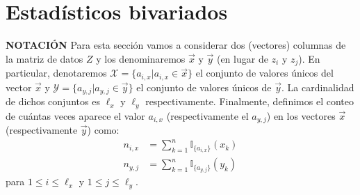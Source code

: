 \documentclass[
]{book}
\begin{document}
\hypertarget{estaduxedsticos-bivariados}{%
\section{Estadísticos bivariados}\label{estaduxedsticos-bivariados}}

\textbf{NOTACIÓN} Para esta sección vamos a considerar dos (vectores) columnas de la matriz de datos \(Z\) y los denominaremos \(\vec{x}\) y \(\vec{y}\) (en lugar de \(z_i\) y \(z_j\)). En particular, denotaremos \(\mathcal{X} = \{ a_{i, x } | a_{i,x} \in \vec{x} \}\) el conjunto de valores únicos del vector \(\vec{x}\) y \(\mathcal{Y} = \{ a_{y ,j} | a_{y ,j} \in \vec{y} \}\) el conjunto de valores únicos de \(\vec{y}\). La cardinalidad de dichos conjuntos es \(\ell_{x}\) y \(\ell_{y}\) respectivamente. Finalmente, definimos el conteo de cuántas veces aparece el valor \(a_{i,x }\) (respectivamente el \(a_{y ,j}\)) en los vectores \(\vec{x}\) (respectivamente \(\vec{y}\)) como:
\begin{equation}
\begin{aligned}
n_{i,x } & = \sum\limits_{k=1}^{n} \mathbb{I}_{\{ a_{i,x } \}}(x_k) \\
n_{y ,j} & = \sum\limits_{k=1}^{n} \mathbb{I}_{\{ a_{y ,j} \}}(y_k)
\end{aligned}
\end{equation}
para \(1 \leq i \leq \ell_{x}\) y \(1 \leq j \leq \ell_{y}\).
\end{document}
